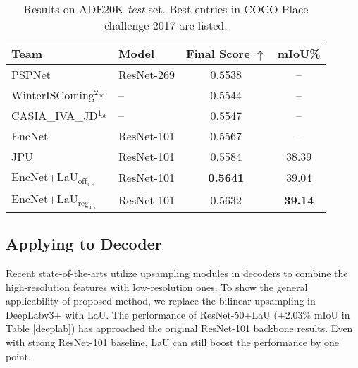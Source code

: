 \documentclass[10pt,twocolumn,letterpaper]{article}
\begin{document}
\begin{table}
  \caption{Results on ADE20K \textit{test} set. Best entries in COCO-Place challenge 2017 are listed.}
  \label{sample-table}
  \centering
\begin{tabular}{llcc}
\hline    
 Team & Model  & Final Score $\uparrow$ & mIoU\%\\
\hline  \hline  
 PSPNet \cite{PSPNet} & ResNet-269 & 0.5538 & --\\
 WinterISComing$^{2_{\text{nd}}}$ & -- & 0.5544 & --\\
CASIA\_IVA\_JD$^{1_{\text{st}}}$ & -- & 0.5547 & --\\
 EncNet \cite{EncNet} & ResNet-101 & 0.5567 & --\\
 JPU \cite{JPU} & ResNet-101 & 0.5584 & 38.39\\
 EncNet+LaU$_{\text{off}_{4\times}}$ & ResNet-101 & \textbf{0.5641} & 39.04\\
 EncNet+LaU$_{\text{reg}_{4\times}}$ & ResNet-101 & 0.5632 & \textbf{39.14}\\
\hline  
  \end{tabular}
\label{ade20k_test}
\end{table}

\subsection{Applying to Decoder}
Recent state-of-the-arts \cite{ASPP, deeplabv3} utilize upsampling modules in decoders to combine the high-resolution features with low-resolution ones. To show the general applicability of proposed method, we replace the bilinear upsampling in DeepLabv3$+$ \cite{deeplabv3} with LaU. The performance of ResNet-50+LaU ($+2.03\%$ mIoU in Table \ref{deeplab}) has approached the original ResNet-101 backbone results. Even with strong ResNet-101 baseline, LaU can still boost the performance by one point.
\end{document}
